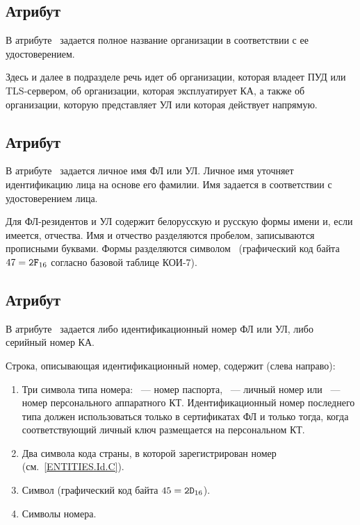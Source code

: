 \subsection{Атрибут }\label{ENTITIES.Id.N}

В атрибуте~ задается полное название организации в соответствии с ее
удостоверением.
%

Здесь и далее в подразделе речь идет об организации, которая владеет ПУД или
TLS-сервером, об организации, которая эксплуатирует КА, а также об
организации, которую представляет УЛ или которая действует напрямую.

\subsection{Атрибут }\label{ENTITIES.Id.GN}

В атрибуте~ задается личное имя ФЛ или УЛ. Личное имя уточняет 
идентификацию лица на основе его фамилии.
%
Имя задается в соответствии с удостоверением лица. 

Для ФЛ-резидентов и УЛ  содержит белорусскую и русскую 
формы имени и, если имеется, отчества. Имя и отчество разделяются пробелом,
записываются прописными буквами.
%
Формы разделяются символом~\str{/} (графический код байта $47=\texttt{2F}_{16}$ 
согласно базовой таблице КОИ-7).
%

\subsection{Атрибут~}\label{ENTITIES.Id.SN}

В атрибуте~ задается либо идентификационный номер ФЛ или УЛ, 
либо серийный номер КА.

Строка, описывающая идентификационный номер, содержит (слева направо):
\begin{enumerate}
\item
Три символа типа номера:
~--- номер паспорта, 
~--- личный номер или
~--- номер персонального аппаратного КТ.
%
Идентификационный номер последнего типа должен использоваться только в
сертификатах ФЛ и только тогда, когда соответствующий личный ключ размещается на
персональном КТ.

\item
Два символа кода страны, в которой зарегистрирован номер 
(см.~\ref{ENTITIES.Id.C}).
\item
Символ \str{-} (графический код байта $45=\texttt{2D}_{16}$).
\item
Символы номера.
\end{enumerate}

